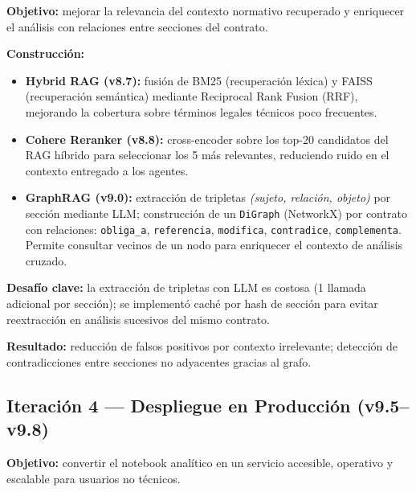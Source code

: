 \textbf{Objetivo:} mejorar la relevancia del contexto normativo recuperado
y enriquecer el análisis con relaciones entre secciones del contrato.

\textbf{Construcción:}
\begin{itemize}
    \item \textbf{Hybrid RAG (v8.7):} fusión de BM25 (recuperación léxica)
    y FAISS (recuperación semántica) mediante Reciprocal Rank Fusion (RRF),
    mejorando la cobertura sobre términos legales técnicos poco frecuentes.
    \item \textbf{Cohere Reranker (v8.8):} cross-encoder sobre los
    top-20 candidatos del RAG híbrido para seleccionar los 5 más relevantes,
    reduciendo ruido en el contexto entregado a los agentes.
    \item \textbf{GraphRAG (v9.0):} extracción de tripletas
    \textit{(sujeto, relación, objeto)} por sección mediante LLM;
    construcción de un \texttt{DiGraph} (NetworkX) por contrato con
    relaciones: \texttt{obliga\_a}, \texttt{referencia}, \texttt{modifica},
    \texttt{contradice}, \texttt{complementa}. Permite consultar vecinos
    de un nodo para enriquecer el contexto de análisis cruzado.
\end{itemize}

\textbf{Desafío clave:} la extracción de tripletas con LLM es costosa
(1 llamada adicional por sección); se implementó caché por hash de sección
para evitar reextracción en análisis sucesivos del mismo contrato.

\textbf{Resultado:} reducción de falsos positivos por contexto irrelevante;
detección de contradicciones entre secciones no adyacentes gracias al grafo.

\subsection{Iteración 4 — Despliegue en Producción (v9.5--v9.8)}

\textbf{Objetivo:} convertir el notebook analítico en un servicio accesible,
operativo y escalable para usuarios no técnicos.


